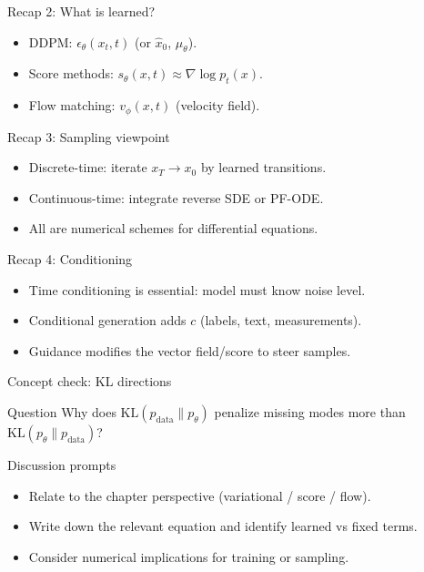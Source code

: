 \documentclass[aspectratio=169]{beamer}
\begin{document}
\begin{frame}{Recap 2: What is learned?}
\begin{itemize}
\item DDPM: \(\epsilon_\theta(x_t,t)\) (or \(\hat x_0\), \(\mu_\theta\)).
\item Score methods: \(s_\theta(x,t)\approx \nabla\log p_t(x)\).
\item Flow matching: \(v_\phi(x,t)\) (velocity field).
\end{itemize}
\end{frame}

\begin{frame}{Recap 3: Sampling viewpoint}
\begin{itemize}
\item Discrete-time: iterate \(x_T\to x_0\) by learned transitions.
\item Continuous-time: integrate reverse SDE or PF-ODE.
\item All are numerical schemes for differential equations.
\end{itemize}
\end{frame}

\begin{frame}{Recap 4: Conditioning}
\begin{itemize}
\item Time conditioning is essential: model must know noise level.
\item Conditional generation adds \(c\) (labels, text, measurements).
\item Guidance modifies the vector field/score to steer samples.
\end{itemize}
\end{frame}


\begin{frame}{Concept check: KL directions}
\begin{block}{Question}
Why does \(\mathrm{KL}(p_{\text{data}}\|p_\theta)\) penalize missing modes more than \(\mathrm{KL}(p_\theta\|p_{\text{data}})\)?
\end{block}
\begin{block}{Discussion prompts}
\begin{itemize}
\item Relate to the chapter perspective (variational / score / flow).
\item Write down the relevant equation and identify learned vs fixed terms.
\item Consider numerical implications for training or sampling.
\end{itemize}
\end{block}
\end{frame}
\end{document}
